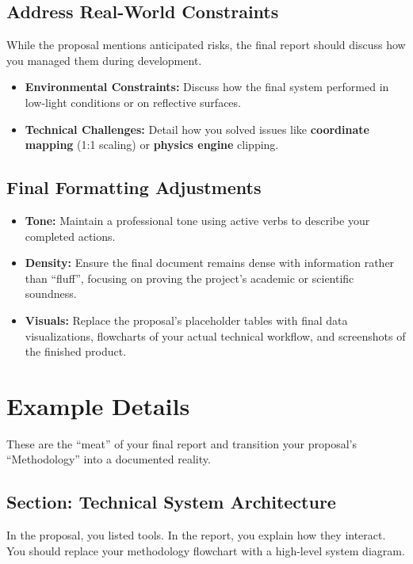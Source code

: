 \documentclass{report}
\begin{document}
\subsection{Address Real-World Constraints}

While the proposal mentions anticipated risks, the final report should discuss
how you managed them during development.

\begin{itemize}
  \item \textbf{Environmental Constraints:} Discuss how the final system
    performed in low-light conditions or on reflective surfaces.
  \item \textbf{Technical Challenges:} Detail how you solved issues like
    \textbf{coordinate mapping} (1:1 scaling) or \textbf{physics engine}
    clipping.
\end{itemize}

\subsection{Final Formatting Adjustments}

\begin{itemize}
  \item \textbf{Tone:} Maintain a professional tone using active verbs to
    describe your completed actions.
  \item \textbf{Density:} Ensure the final document remains dense with
    information rather than ``fluff'', focusing on proving the project's
    academic or scientific soundness.
  \item \textbf{Visuals:} Replace the proposal's placeholder tables with final
    data visualizations, flowcharts of your actual technical workflow, and
    screenshots of the finished product.
\end{itemize}

\section{Example Details}

These are the ``meat'' of your final report and transition your proposal's
``Methodology'' into a documented reality.

\subsection{Section: Technical System Architecture}

In the proposal, you listed tools. In the report, you explain how they interact.
You should replace your methodology flowchart with a high-level system diagram.
\end{document}
